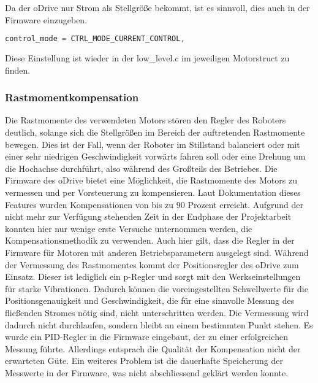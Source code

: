 Da der oDrive nur Strom als Stellgröße bekommt, ist es sinnvoll, dies auch in der Firmware einzugeben.
\begin{lstlisting}[language=C++]
control_mode = CTRL_MODE_CURRENT_CONTROL,
\end{lstlisting}
Diese Einstellung ist wieder in der low\_level.c im jeweiligen Motorstruct zu finden.

\subsubsection{Rastmomentkompensation}
Die Rastmomente des verwendeten Motors stören den Regler des Roboters deutlich, solange sich die Stellgrößen im Bereich der auftretenden Rastmomente bewegen. Dies ist der Fall, wenn der Roboter im Stillstand balanciert oder mit einer sehr niedrigen Geschwindigkeit vorwärts fahren soll oder eine Drehung um die Hochachse durchführt, also während des Großteils des Betriebes.
Die Firmware des oDrive bietet eine Möglichkeit, die Rastmomente des Motors zu vermessen und per Vorsteuerung zu kompensieren. Laut Dokumentation dieses Features wurden Kompensationen von bis zu 90 Prozent erreicht. Aufgrund der nicht mehr zur Verfügung stehenden Zeit in der Endphase der Projektarbeit konnten hier nur wenige erste Versuche unternommen werden, die Kompensationsmethodik zu verwenden. Auch hier gilt, dass die Regler in der Firmware für Motoren mit anderen Betriebsparametern ausgelegt sind. Während der Vermessung des Rastmomentes kommt der Positionsregler des oDrive zum Einsatz. Dieser ist lediglich ein p-Regler und sorgt mit den Werkseinstellungen für starke Vibrationen. Dadurch können die voreingestellten Schwellwerte für die Positionsgenauigkeit und Geschwindigkeit, die für eine sinnvolle Messung des fließenden Stromes nötig sind, nicht unterschritten werden. Die Vermessung wird dadurch nicht durchlaufen, sondern bleibt an einem bestimmten Punkt stehen.
Es wurde ein PID-Regler in die Firmware eingebaut, der zu  einer erfolgreichen Messung führte. Allerdings entsprach die Qualität der Kompensation nicht der erwarteten Güte. Ein weiteres Problem ist die dauerhafte Speicherung der Messwerte in der Firmware, was nicht abschliessend geklärt werden konnte.











\newpage
